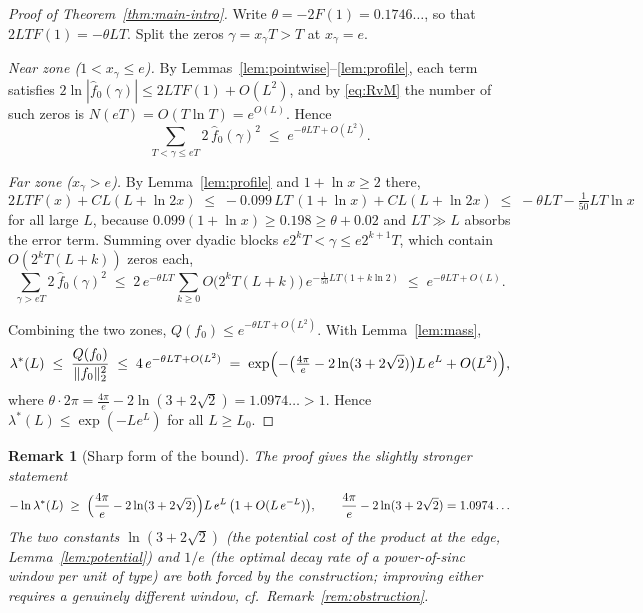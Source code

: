﻿\documentclass[11pt]{article}
\newtheorem{remark}[theorem]{Remark}
\newcommand{\lmin}{\lambda^{*}}
\newcommand{\fhat}{\hat f}
\begin{document}
\begin{proof}[Proof of Theorem~\ref{thm:main-intro}]
Write $\theta=-2F(1)=0.1746\ldots$, so that $2LTF(1)=-\theta LT$.
Split the zeros $\gamma=x_\gamma T>T$ at $x_\gamma=e$.

\emph{Near zone ($1<x_\gamma\le e$).}  By
Lemmas~\ref{lem:pointwise}--\ref{lem:profile}, each term satisfies
$2\ln|\fhat_0(\gamma)|\le2LTF(1)+O(L^{2})$, and by \eqref{eq:RvM} the
number of such zeros is $N(eT)=O(T\ln T)=e^{O(L)}$.  Hence
\[
  \sum_{T<\gamma\le eT}2\,\fhat_0(\gamma)^{2}
  \;\le\;e^{-\theta LT+O(L^{2})}.
\]

\emph{Far zone ($x_\gamma>e$).}  By Lemma~\ref{lem:profile} and
$1+\ln x\ge2$ there,
\[
  2LTF(x)+CL(L+\ln2x)\;\le\;-0.099\,LT\,(1+\ln x)+CL(L+\ln 2x)
  \;\le\;-\theta LT-\tfrac{1}{50}LT\ln x
\]
for all large $L$, because $0.099(1+\ln x)\ge0.198\ge\theta+0.02$ and
$LT\gg L$ absorbs the error term.  Summing over dyadic blocks
$e2^{k}T<\gamma\le e2^{k+1}T$, which contain $O(2^{k}T(L+k))$ zeros
each,
\[
  \sum_{\gamma>eT}2\,\fhat_0(\gamma)^{2}
  \;\le\;2\,e^{-\theta LT}\sum_{k\ge0}O\bigl(2^{k}T(L+k)\bigr)\,
  e^{-\frac{1}{50}LT(1+k\ln2)}
  \;\le\;e^{-\theta LT+O(L)} .
\]

Combining the two zones, $Q(f_0)\le e^{-\theta LT+O(L^{2})}$.  With
Lemma~\ref{lem:mass},
\[
  \lmin(L)\;\le\;\frac{Q(f_0)}{\|f_0\|_2^2}
  \;\le\;4\,e^{-\theta LT+O(L^2)}
  \;=\;\exp\Bigl(-\bigl(\tfrac{4\pi}{e}-2\ln(3+2\sqrt2)\bigr)
  L\,e^{L}+O(L^{2})\Bigr),
\]
where $\theta\cdot2\pi=\frac{4\pi}{e}-2\ln(3+2\sqrt2)
=1.0974\ldots>1$.  Hence $\lmin(L)\le\exp(-Le^{L})$ for all
$L\ge L_0$.
\end{proof}

\begin{remark}[Sharp form of the bound]\label{rem:sharp}
The proof gives the slightly stronger statement
\[
  -\ln\lmin(L)\;\ge\;
  \Bigl(\frac{4\pi}{e}-2\ln(3+2\sqrt2)\Bigr)L\,e^{L}\,
  \bigl(1+O(L\,e^{-L})\bigr),
  \qquad
  \frac{4\pi}{e}-2\ln(3+2\sqrt2)=1.0974\ldots
\]
The two constants $\ln(3+2\sqrt2)$ (the potential cost of the product
at the edge, Lemma~\ref{lem:potential}) and $1/e$ (the optimal decay
rate of a power-of-sinc window per unit of type) are both forced by
the construction; improving either requires a genuinely different
window, cf.\ Remark~\ref{rem:obstruction}.
\end{remark}
\end{document}
